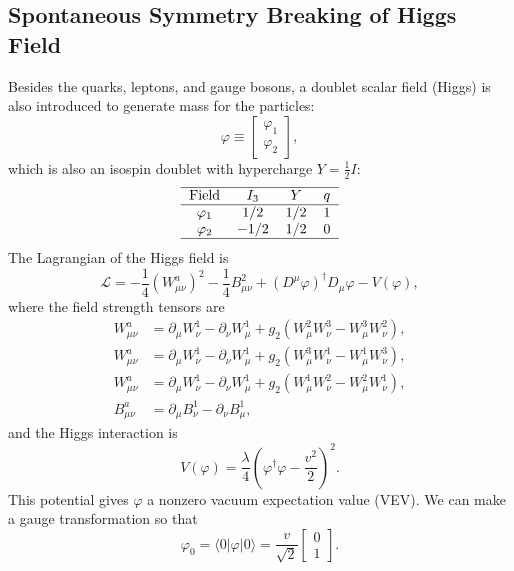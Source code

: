 \documentclass[aps,rmp,twocolumn,superscriptaddress,nofootinbib]{revtex4-2}
\begin{document}
\subsection{Spontaneous Symmetry Breaking of Higgs Field}
Besides the quarks, leptons, and gauge bosons, a doublet scalar field (Higgs) is also introduced to generate mass for the particles:
\begin{equation}
	\varphi \equiv \left[\begin{array}{c}
		\varphi_1 \\ \varphi_2
	\end{array} \right],
\end{equation}
which is also an isospin doublet with hypercharge $Y=\frac{1}{2}I$:
\begin{equation*}
	\begin{tabular}{c c c c}
		\hline 
		Field & $I_3$ & $Y$ & $q$\\ \hline
		$\varphi_1$ & $1/2$ & $1/2$ & $1$ \\ 
		$\varphi_2$ & $-1/2$ & $1/2$ & $0$ \\  
		\hline 
	\end{tabular}
\end{equation*}
The Lagrangian of the Higgs field is 
\begin{equation}\label{eq:SM-Higgs-L1}
	\mathcal L = -\frac{1}{4}(W^a_{\mu\nu})^2 - \frac{1}{4}B_{\mu\nu}^2 +(D^\mu \varphi)^\dagger D_\mu \varphi- V(\varphi),
\end{equation}
where the field strength tensors are
\begin{equation*}
\begin{aligned}
	W^a_{\mu\nu} &= \partial_\mu W_\nu^1 - \partial_\nu W^1_\mu + g_2 (W_\mu^2 W_\nu^3 - W_\mu^3 W_\nu^2), \\
	W^a_{\mu\nu} &= \partial_\mu W_\nu^1 - \partial_\nu W^1_\mu + g_2 (W_\mu^3 W_\nu^1 - W_\mu^1 W_\nu^3), \\
	W^a_{\mu\nu} &= \partial_\mu W_\nu^1 - \partial_\nu W^1_\mu + g_2 (W_\mu^1 W_\nu^2 - W_\mu^2 W_\nu^1), \\
	B^a_{\mu\nu} &= \partial_\mu B_\nu^1 - \partial_\nu B^1_\mu,
\end{aligned}
\end{equation*}
and the Higgs interaction is
\begin{equation}
	V(\varphi) = \frac{\lambda}{4} \left(\varphi^\dagger \varphi - \frac{v^2}{2} \right)^2.
\end{equation}
This potential gives $\varphi$ a nonzero vacuum expectation value (VEV). 
We can make a gauge transformation so that
\begin{equation}
	\varphi_0 = \langle 0| \varphi |0\rangle = \frac{v}{\sqrt 2} \left[\begin{array}{c}
		0 \\ 1	\end{array} \right].
\end{equation}
\end{document}
